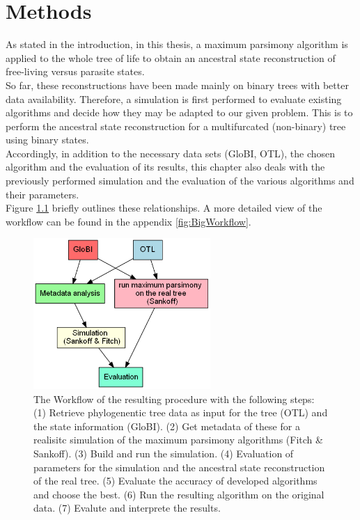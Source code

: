\chapter{Methods}
  As stated in the introduction, in this thesis, a maximum parsimony algorithm is applied to the 
    whole tree of life to obtain an ancestral state reconstruction of free-living versus parasite 
    states. \\
  So far, these reconstructions have been made mainly on binary trees with better data availability. 
    Therefore, a simulation is first performed to evaluate existing algorithms and decide how they 
    may be adapted to our given problem. This is to perform the ancestral state reconstruction for a 
    multifurcated (non-binary) tree using binary states. \\
  Accordingly, in addition to the necessary data sets (GloBI, OTL), the chosen algorithm and the 
    evaluation of its results, this chapter also deals with the previously performed simulation and 
    the evaluation of the various algorithms and their parameters. \\
  Figure \ref{fig:workflow} briefly outlines these relationships. A more detailed view of the 
    workflow can be found in the appendix \ref{fig:BigWorkflow}.
  \begin{figure}[h!]
    \centering
    \includegraphics[width=0.6\textwidth]{Figures/Workflow-overview.png}
    \caption{The Workflow of the resulting procedure with the following steps: \\
      (1) Retrieve phylogenentic tree data as input for the tree (OTL) and the state information (GloBI).
      (2) Get metadata of these for a realisitc simulation of the maximum parsimony algorithms (Fitch \& Sankoff).
      (3) Build and run the simulation.
      (4) Evaluation of parameters for the simulation and the ancestral state reconstruction of the real tree.
      (5) Evaluate the accuracy of developed algorithms and choose the best.
      (6) Run the resulting algorithm on the original data.
      (7) Evalute and interprete the results. %
    }
    \label{fig:workflow}
  \end{figure}
  
